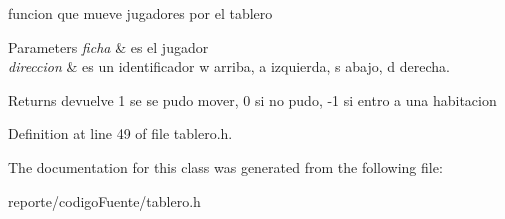 funcion que mueve jugadores por el tablero 


\begin{DoxyParams}{Parameters}
{\em ficha} & es el jugador \\
\hline
{\em direccion} & es un identificador w arriba, a izquierda, s abajo, d derecha. \\
\hline
\end{DoxyParams}
\begin{DoxyReturn}{Returns}
devuelve 1 se se pudo mover, 0 si no pudo, -\/1 si entro a una habitacion 
\end{DoxyReturn}


Definition at line 49 of file tablero.\+h.



The documentation for this class was generated from the following file\+:\begin{DoxyCompactItemize}
\item 
reporte/codigo\+Fuente/tablero.\+h\end{DoxyCompactItemize}

